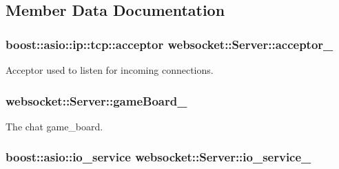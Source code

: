 \subsection{Member Data Documentation}
\subsubsection[{\texorpdfstring{acceptor\+\_\+}{acceptor_}}]{\setlength{\rightskip}{0pt plus 5cm}boost\+::asio\+::ip\+::tcp\+::acceptor websocket\+::\+Server\+::acceptor\+\_\+\hspace{0.3cm}{\ttfamily [private]}}\hypertarget{classwebsocket_1_1Server_a377152422807e2f13cc1c6bb18fb416f}{}\label{classwebsocket_1_1Server_a377152422807e2f13cc1c6bb18fb416f}


Acceptor used to listen for incoming connections. 

\subsubsection[{\texorpdfstring{game\+Board\+\_\+}{gameBoard_}}]{ websocket\+::\+Server\+::game\+Board\+\_\+\hspace{0.3cm}{\ttfamily [private]}}\hypertarget{classwebsocket_1_1Server_a412c87233cbe63db77ba955f413c5ef0}{}\label{classwebsocket_1_1Server_a412c87233cbe63db77ba955f413c5ef0}


The chat game\+\_\+board. 

\subsubsection[{\texorpdfstring{io\+\_\+service\+\_\+}{io_service_}}]{\setlength{\rightskip}{0pt plus 5cm}boost\+::asio\+::io\+\_\+service websocket\+::\+Server\+::io\+\_\+service\+\_\+\hspace{0.3cm}{\ttfamily [private]}}\hypertarget{classwebsocket_1_1Server_ab3dc5f36bb4b0913c803915d3191a771}{}\label{classwebsocket_1_1Server_ab3dc5f36bb4b0913c803915d3191a771}


